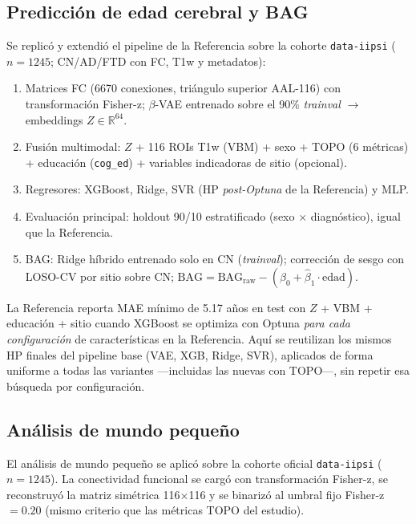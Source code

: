 \documentclass[12pt,a4paper]{article}
\begin{document}
\subsection{Predicción de edad cerebral y BAG}

Se replicó y extendió el pipeline de la Referencia sobre la cohorte \texttt{data-iipsi}
($n = 1245$; CN/AD/FTD con FC, T1w y metadatos):

\begin{enumerate}
  \item Matrices FC (6670 conexiones, triángulo superior AAL-116) con transformación Fisher-z;
        $\beta$-VAE entrenado sobre el 90\% \emph{trainval} $\rightarrow$ embeddings $Z \in \mathbb{R}^{64}$.
  \item Fusión multimodal: $Z$ + 116 ROIs T1w (VBM) + sexo + TOPO (6 métricas) + educación
        (\texttt{cog\_ed}) + variables indicadoras de sitio (opcional).
  \item Regresores: XGBoost, Ridge, SVR (HP \emph{post-Optuna} de la Referencia) y MLP.
  \item Evaluación principal: holdout 90/10 estratificado (sexo $\times$ diagnóstico), igual que la Referencia.
  \item BAG: Ridge híbrido entrenado solo en CN (\emph{trainval}); corrección de sesgo con LOSO-CV
        por sitio sobre CN; $\text{BAG} = \text{BAG}_{\text{raw}} - (\hat{\beta}_0 + \hat{\beta}_1 \cdot \text{edad})$.
\end{enumerate}

La Referencia reporta MAE mínimo de 5.17 años en test con $Z$ + VBM + educación + sitio cuando
XGBoost se optimiza con Optuna \emph{para cada configuración} de características en la Referencia.
Aquí se reutilizan los mismos HP finales del pipeline base
(VAE, XGB, Ridge, SVR), aplicados de forma uniforme a todas las variantes ---incluidas las
nuevas con TOPO---, sin repetir esa búsqueda por configuración.

\subsection{Análisis de mundo pequeño}

El análisis de mundo pequeño se aplicó sobre la cohorte oficial \texttt{data-iipsi}
($n = 1245$). La conectividad funcional se cargó con transformación Fisher-z,
se reconstruyó la matriz simétrica 116$\times$116 y se binarizó al umbral fijo Fisher-z $= 0.20$
(mismo criterio que las métricas TOPO del estudio).
\end{document}
